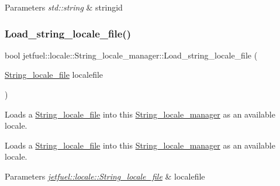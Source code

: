 \begin{DoxyParams}{Parameters}
{\em std\+::string} & stringid \\
\hline
\end{DoxyParams}
\mbox{\label{classjetfuel_1_1locale_1_1String__locale__manager_a2a972352f2b52a6aec947aad636ca6f1}} 
\subsubsection{\texorpdfstring{Load\+\_\+string\+\_\+locale\+\_\+file()}{Load\_string\_locale\_file()}}
{\footnotesize\ttfamily bool jetfuel\+::locale\+::\+String\+\_\+locale\+\_\+manager\+::\+Load\+\_\+string\+\_\+locale\+\_\+file (\begin{DoxyParamCaption}\item[{\hyperlink{classjetfuel_1_1locale_1_1String__locale__file}{String\+\_\+locale\+\_\+file}}]{localefile }\end{DoxyParamCaption})\hspace{0.3cm}{\ttfamily [inline]}}



Loads a \hyperlink{classjetfuel_1_1locale_1_1String__locale__file}{String\+\_\+locale\+\_\+file} into this \hyperlink{classjetfuel_1_1locale_1_1String__locale__manager}{String\+\_\+locale\+\_\+manager} as an available locale. 

Loads a \hyperlink{classjetfuel_1_1locale_1_1String__locale__file}{String\+\_\+locale\+\_\+file} into this \hyperlink{classjetfuel_1_1locale_1_1String__locale__manager}{String\+\_\+locale\+\_\+manager} as an available locale.


\begin{DoxyParams}{Parameters}
{\em \hyperlink{classjetfuel_1_1locale_1_1String__locale__file}{jetfuel\+::locale\+::\+String\+\_\+locale\+\_\+file}} & localefile \\
\hline
\end{DoxyParams}
\mbox{\label{classjetfuel_1_1locale_1_1String__locale__manager_a2bca626efc214510e533a8c4ece7cafb}} 
